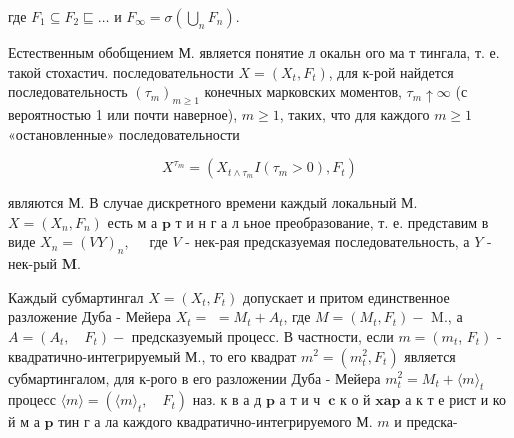 \documentclass[10pt]{article}
\begin{document}
где $F_{1} \subseteq F_{2} \sqsubseteq \ldots$ и $F_{\infty}=\sigma\left(\bigcup_{n} F_{n}\right)$.



Естественным обобщением М. является понятие л окальн ого ма т тингала, т. е. такой стохастич. последовательности $X=\left(X_{t}, F_{t}\right)$, для к-рой найдется последовательность $\left(\tau_{m}\right)_{m \geqslant 1}$ конечных марковских моментов, $\tau_{m} \uparrow \infty$ (с вероятностью 1 или почти наверное), $m \geqslant 1$, таких, что для каждого $m \geqslant 1$ «остановленные» последовательности



\[

X^{\tau_{m}}=\left(X_{t \wedge \tau_{m}} I\left(\tau_{m}>0\right), F_{t}\right)

\]



являются М. В случае дискретного времени каждый локальный М. $X=\left(X_{n}, F_{n}\right)$ есть м а $\mathbf{p}$ т и н г а л ьное преобразование, т. е. представим в виде $X_{n}=(V Y)_{n}, \quad$ где $V$ - нек-рая предсказуемая последовательность, а $Y$ - нек-рый $\mathbf{M}$.



Каждый субмартингал $X=\left(X_{t}, F_{t}\right)$ допускает и притом единственное разложение Дуба - Мейера $X_{t}=$ $=M_{t}+A_{t}$, где $M=\left(M_{t}, F_{t}\right)-$ M., а $A=\left(A_{t}, \quad F_{t}\right)-$ предсказуемый процесс. В частности, если $m=\left(m_{t}\right.$, $\left.F_{t}\right)$ - квадратично-интегрируемый М., то его квадрат $m^{2}=\left(m_{t}^{2}, F_{t}\right)$ является субмартингалом, для к-рого в его разложении Дуба - Мейера $m_{t}^{2}=M_{t}+\langle m\rangle_{t}$ процесс $\langle m\rangle=\left(\langle m\rangle_{t}, \quad F_{t}\right)$ наз. к в а д $\mathbf{p}$ а т и ч $\mathbf{~} \mathbf{c}$ к о й $\mathbf{x a p}$ а к т е рист и ко й м а $\mathbf{p}$ тин г а ла каждого квадратично-интегрируемого М. $m$ и предска-
\end{document}
